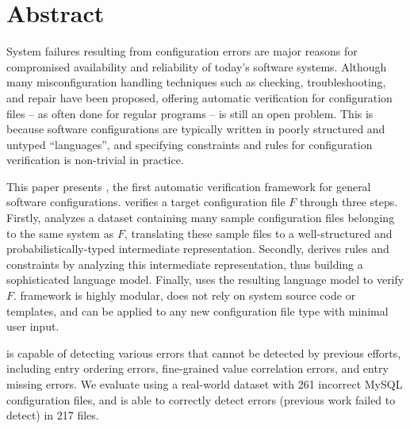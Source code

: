 
\section*{Abstract}

System failures resulting from configuration errors 
are major reasons for compromised availability and
reliability of today's software systems.
Although many misconfiguration handling techniques
such as checking, troubleshooting, and repair
have been proposed, 
offering automatic verification for configuration files -- as often  
done for regular programs -- is still an open problem.
This is because software configurations are typically written in
poorly structured and untyped ``languages'', and 
specifying constraints and rules for configuration 
verification is non-trivial in practice.

This paper presents \app, the first automatic verification framework for
general software configurations.
\app verifies a target configuration file $F$ through three steps.
Firstly, \app analyzes a dataset containing many sample configuration 
files belonging to the same system as $F$,
translating these sample files to a
well-structured and probabilistically-typed 
intermediate representation.
Secondly, \app derives rules and constraints by analyzing
this intermediate representation, thus building a
sophisticated language model.
Finally, \app uses the resulting language model to verify $F$.
\app framework is highly modular, 
does not rely on system source code or templates, and
can be applied to any new configuration file type with minimal user input. 

\app is capable of detecting various errors that cannot
be detected by previous efforts,
including entry ordering errors, fine-grained value correlation errors, 
and entry missing errors. 
We evaluate \app using a real-world dataset with 261 incorrect 
MySQL configuration files,
and \app is able to correctly 
detect errors (previous work failed to
detect) in 217 files.
